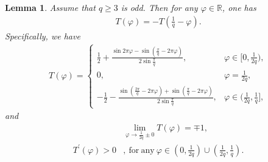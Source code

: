 \documentclass[12pt]{amsart}
\theoremstyle{plain}
\newtheorem{lemma}[theorem]{Lemma}
\theoremstyle{definition}
\begin{document}
	
	\begin{lemma}\label{lssccs}Assume that $q\geq3$ is odd. Then for any $\varphi\in \mathbb{R}$, one has
		\begin{align}\label{tqduichen}
			T(\varphi)=-T\left(\frac{1}{q}-\varphi\right).
		\end{align}
		Specifically,	we have
		\begin{align}
			T(\varphi)=\begin{cases}
				\label{ssccs}\frac{1}{2}+\frac{\sin2\pi\varphi-\sin\left(\frac{\pi}{q}-2\pi\varphi\right)}{2\sin\frac{\pi}{q}}, & \varphi\in[0,\frac{1}{2q}),\\
				0, & \varphi=\frac{1}{2q},\\
				-\frac{1}{2}-\frac{\sin\left(\frac{2\pi}{q}-2\pi\varphi\right)+\sin\left(\frac{\pi}{q}-2\pi\varphi\right)}{2\sin\frac{\pi}{q}}, & \varphi\in  (\frac{1}{2q}, \frac{1}{q}],
			\end{cases}
		\end{align}
		and
		\begin{align}
			\label{mp1}&\lim_{\varphi\to\frac{1}{2q}\pm0}T(\varphi)=\mp1,\\
			\label{tqpdy0}T^{\prime}(\varphi)>0&, \mathrm{\ for\ any\ }\varphi\in\left(0,\frac{1}{2q}\right)\cup\left(\frac{1}{2q},\frac{1}{q}\right).
		\end{align}
	\end{lemma}
\end{document}
